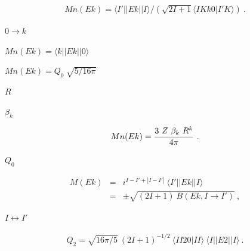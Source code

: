 \documentclass[11pt]{article}
\def\lthtmlcheckvsize{\ifdim\ht\sizebox<\vsize 
  \ifdim\wd\sizebox<\hsize\expandafter\hfill\fi \expandafter\vfill
  \else\expandafter\vss\fi}%
\begin{document}
{\newpage\clearpage
{}%
\begin{eqnarray*}
  Mn(Ek) = \langle I ' || Ek || I \rangle
                     / (\sqrt {2I+1}  \langle IK k0 | I ' K \rangle ) \ .
  \end{eqnarray*}%
\lthtmldisplayZ
\lthtmlcheckvsize\clearpage}

{\newpage\clearpage
{}%
$0 \rightarrow k$%
\lthtmlindisplaymathZ
\lthtmlcheckvsize\clearpage}

{\newpage\clearpage
{}%
$ Mn(Ek)= \langle k || Ek || 0 \rangle$%
\lthtmlindisplaymathZ
\lthtmlcheckvsize\clearpage}

{\newpage\clearpage
{}%
$Mn(Ek) = Q _ 0 ~ \sqrt {5 / {16 \pi}}$%
\lthtmlindisplaymathZ
\lthtmlcheckvsize\clearpage}

{\newpage\clearpage
{}%
$R$%
\lthtmlindisplaymathZ
\lthtmlcheckvsize\clearpage}

{\newpage\clearpage
{}%
$\beta_k$%
\lthtmlindisplaymathZ
\lthtmlcheckvsize\clearpage}

{\newpage\clearpage
{}%
\begin{eqnarray*}
  Mn(Ek) = {{3 ~ Z ~ \beta _ k ~ R^k} \over {4 \pi}}  \ .
\end{eqnarray*}%
\lthtmldisplayZ
\lthtmlcheckvsize\clearpage}

{\newpage\clearpage
{}%
$Q_{0}$%
\lthtmlindisplaymathZ
\lthtmlcheckvsize\clearpage}

{\newpage\clearpage
{}%
\begin{eqnarray*}
  M(Ek) & = &i^{ I-I ' + |I-I ' | } ~ \langle I ' || Ek || I \rangle \\
     & =& \pm \sqrt{ (2I+1) ~ B(Ek, I \rightarrow I ' ) } \ ,
\end{eqnarray*}%
\lthtmldisplayZ
\lthtmlcheckvsize\clearpage}

{\newpage\clearpage
{}%
$I \leftrightarrow I'$%
\lthtmlindisplaymathZ
\lthtmlcheckvsize\clearpage}

{\newpage\clearpage
{}%
\begin{eqnarray*}
Q_2 = \sqrt {{16 \pi} /5} ~ (2I+1)^{-1/2} ~ \langle II 20 | II \rangle ~\langle I || E2 || I \rangle \ .
\end{eqnarray*}%
\lthtmldisplayZ
\lthtmlcheckvsize\clearpage}
\end{document}
